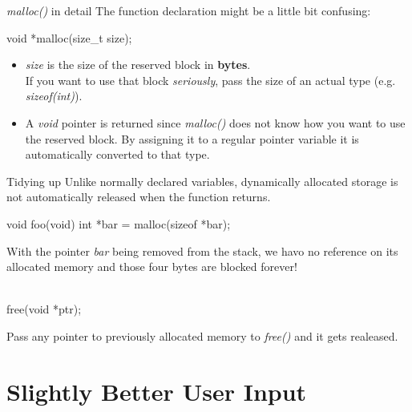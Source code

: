 \documentclass[10pt,graphics,aspectratio=169,table]{beamer}
\begin{document}
\begin{frame}[fragile]{\textit{malloc()} in detail}
	The function declaration might be a little bit confusing:
	\begin{codeblock}
void *malloc(size_t size);
    \end{codeblock}
	\begin{itemize}
		\item \textit{size} is the size of the reserved block in \textbf{bytes}. \\
		If you want to use that block \textit{seriously}, pass the size of an actual type (e.g. \textit{sizeof(int)}).
		\item A \textit{void} pointer is returned since \textit{malloc()} does not know how you want to use the reserved block. By assigning it to a regular pointer variable it is automatically converted to that type.
	\end{itemize}
\end{frame}
\begin{frame}[fragile]{Tidying up}
	Unlike normally declared variables, dynamically allocated storage is not automatically released when the function returns.
	\begin{codeblock}
void foo(void) {
	int *bar = malloc(sizeof *bar);
}
\end{codeblock}
	
With the pointer \textit{bar} being removed from the stack, we havo no reference on its allocated memory and those four bytes are blocked forever! \\
	\ \\
	\begin{codeblock}
free(void *ptr);
\end{codeblock}

Pass any pointer to previously allocated memory to \textit{free()} and it gets realeased.
\end{frame}

\section{Slightly Better User Input}
\end{document}
